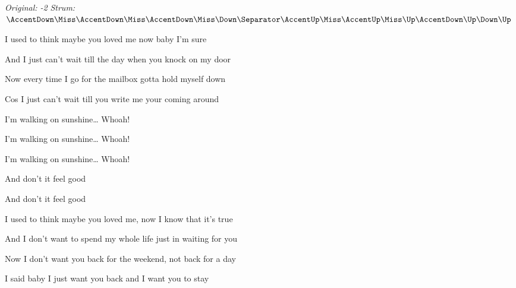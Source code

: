 \begin{song}


\begin{headerbox}
\RaiseBoxWithAccents
\textit{Original: -2} \quad
\textit{Strum:} $\AccentDown\Miss\AccentDown\Miss\AccentDown\Miss\Down \Separator \AccentUp\Miss\AccentUp\Miss\Up\AccentDown\Up\Down\Up$ \quad
\end{headerbox}

\begin{hchordbox}
\end{hchordbox}

\bigskip

I used to think maybe you loved me now baby I'm sure    \par
And I just can’t wait till the day when you knock on my door    \par
Now every time I go for the mailbox gotta hold myself down    \par
Cos I just can’t wait till you write me your coming around    \par

\bigskip

I'm walking on sunshine… Whoah! \par
I'm walking on sunshine… Whoah! \par
I'm walking on sunshine… Whoah! \par
And don't it feel good    \par
And don’t it feel good    \par

\bigskip

I used to think maybe you loved me, now I know that it's true    \par
And I don't want to spend my whole life just in waiting for you    \par
Now I don't want you back for the weekend, not back for a day    \par
I said baby I just want you back and I want you to stay    \par


\end{song}
